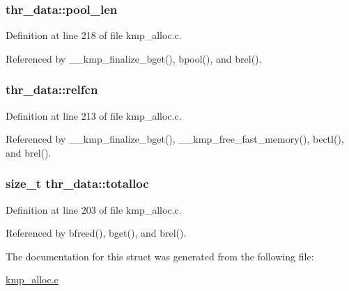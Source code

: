 \hypertarget{structthr__data_a614e5671e1497475cd564343d2a1cd3f}{
\subsubsection[{pool\-\_\-len}]{ thr\-\_\-data\-::pool\-\_\-len}}\label{structthr__data_a614e5671e1497475cd564343d2a1cd3f}


Definition at line 218 of file kmp\-\_\-alloc.\-c.



Referenced by \-\_\-\-\_\-kmp\-\_\-finalize\-\_\-bget(), bpool(), and brel().

\hypertarget{structthr__data_ab94c9cee76c857baf0a3a3d887b47bd1}{
\subsubsection[{relfcn}]{ thr\-\_\-data\-::relfcn}}\label{structthr__data_ab94c9cee76c857baf0a3a3d887b47bd1}


Definition at line 213 of file kmp\-\_\-alloc.\-c.



Referenced by \-\_\-\-\_\-kmp\-\_\-finalize\-\_\-bget(), \-\_\-\-\_\-kmp\-\_\-free\-\_\-fast\-\_\-memory(), bectl(), and brel().

\hypertarget{structthr__data_a190c144a686f291c888741d25b4f6547}{
\subsubsection[{totalloc}]{\setlength{\rightskip}{0pt plus 5cm}size\-\_\-t thr\-\_\-data\-::totalloc}}\label{structthr__data_a190c144a686f291c888741d25b4f6547}


Definition at line 203 of file kmp\-\_\-alloc.\-c.



Referenced by bfreed(), bget(), and brel().



The documentation for this struct was generated from the following file\-:\begin{DoxyCompactItemize}
\item 
\hyperlink{kmp__alloc_8c}{kmp\-\_\-alloc.\-c}\end{DoxyCompactItemize}
